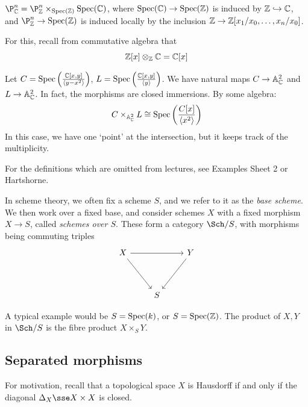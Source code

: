 \documentclass{article}
\begin{document}
\begin{example}
    \(\P^n_\C = \P^n_\Z \times_{\Spec(\Z)} \Spec(\C)\), where \(\operatorname{Spec}(\mathbb{C}) \to \operatorname{Spec}(\mathbb{Z})\) is induced by \(\mathbb{Z} \hookrightarrow \mathbb{C}\), and \(\P^n_\Z \to \Spec(\Z)\) is induced locally by the inclusion \(\mathbb{Z} \to \mathbb{Z}[x_1/x_0, \dots, x_n/x_0]\).
    
    For this, recall from commutative algebra that
    \[\mathbb{Z}[x] \otimes_{\mathbb{Z}} \mathbb{C} = \mathbb{C}[x]\]
\end{example}

\begin{example}
    Let \(C = \operatorname{Spec}\left(\frac{\mathbb{C}[x, y]}{\left\langle y - x^2 \right\rangle}\right)\), \(L = \operatorname{Spec}\left(\frac{\mathbb{C}[x, y]}{\left\langle y \right\rangle}\right)\). We have natural maps \(C \to \mathbb{A}_{\mathbb{C}}^{2}\) and \(L \to \mathbb{A}_{\mathbb{C}}^{2}\). In fact, the morphisms are closed immersions. By some algebra:
    \[C \times_{\mathbb{A}_{\mathbb{C}}^{2}} L \cong \operatorname{Spec}\left(\frac{C[x]}{\left\langle x^2 \right\rangle}\right)\]
    In this case, we have one `point' at the intersection, but it keeps track of the multiplicity.
\end{example}

\lec

For the definitions which are omitted from lectures, see Examples Sheet 2 or Hartshorne.

\begin{definition}
    In scheme theory, we often fix a scheme \(S\), and we refer to it as the \emph{base scheme}. We then work over a fixed base, and consider schemes \(X\) with a fixed morphism \(X \to S\), called \emph{schemes over \(S\)}. These form a category \(\Sch/S\), with morphisms being commuting triples
\[\begin{tikzcd}
	X && Y \\
	\\
	& S
	\arrow[from=1-1, to=3-2]
	\arrow[from=1-1, to=1-3]
	\arrow[from=1-3, to=3-2]
\end{tikzcd}\]
\end{definition}
A typical example would be \(S = \operatorname{Spec}(k)\), or \(S = \operatorname{Spec}(\mathbb{Z})\). The product of \(X, Y\) in \(\Sch/S\) is the fibre product \(X \times_S Y\).

\subsection{Separated morphisms}

For motivation, recall that a topological space \(X\) is Hausdorff if and only if the diagonal \(\Delta_X \sse X \times X\) is closed.
\end{document}
